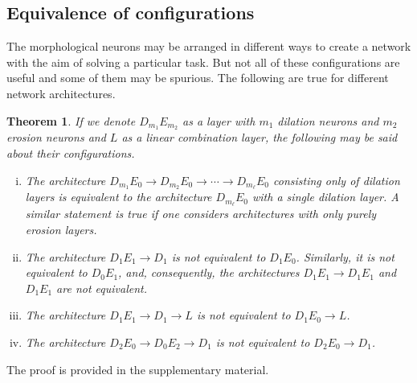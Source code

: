 \documentclass{bmvc2k}
\newtheorem{theorem}{Theorem}
\begin{document}
\subsection{Equivalence of configurations}
The morphological neurons may be arranged in different ways to create a network with the aim of solving a particular task. But not all of these configurations are useful and some of them may be spurious. The following are true for different network architectures.
\begin{theorem}
If we denote $D_{m_1}E_{m_2}$ as a layer with $m_1$ dilation neurons and $m_2$ erosion neurons and $L$ as a linear combination layer, the following may be said about their configurations. 
\begin{enumerate}[(i)]
    \item The architecture $D_{m_1}E_{0}\rightarrow D_{m_2}E_{0} \rightarrow \cdots \rightarrow D_{m_\ell} E_{0}$ consisting only of dilation layers is equivalent to the architecture $D_{m_\ell}E_{0}$ with a single dilation layer. A similar statement is true if one considers architectures with only purely erosion layers.
    \item The architecture $D_1E_1 \rightarrow D_1$ is not equivalent to $D_1E_0$. Similarly, it is not equivalent to $D_0E_1$, and, consequently, the architectures $D_1E_1 \rightarrow D_1E_1$ and $D_1E_1$ are not equivalent.
    \item The architecture $D_1 E_1 \rightarrow D_1 \rightarrow L$ is not equivalent to $D_1E_0 \rightarrow L$.
    \item The architecture $D_{2}E_{0}\rightarrow D_{0}E_{2} \rightarrow D_1$ is not equivalent to $D_{2}E_{0} \rightarrow D_1$.
\end{enumerate}
\end{theorem}
The proof is provided in the supplementary material.
\end{document}

